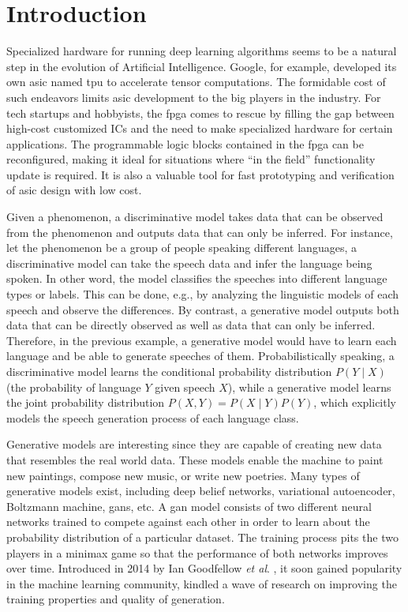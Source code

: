 
\chapter{Introduction}

Specialized hardware for running deep learning algorithms seems to be a natural step in the evolution of
Artificial Intelligence.  Google, for example, developed its own \gls{asic} named \gls{tpu}
to accelerate tensor computations. The formidable cost of such endeavors limits \gls{asic} development to
the big players in the industry. For tech startups and hobbyists, the \gls{fpga} comes to rescue by filling
the gap between high-cost customized ICs and the need to make specialized hardware for certain
applications. The programmable logic blocks contained in the \gls{fpga} can be reconfigured, making it
ideal for situations where "`in the field"' functionality update is required. It is also a valuable tool
for fast prototyping and verification of \gls{asic} design with low cost.

Given a phenomenon, a discriminative model takes data that can be observed from the phenomenon and outputs
data that can only be inferred. For instance, let the phenomenon be a group of people speaking different
languages, a discriminative model can take the speech data and infer the language being spoken. In other
word, the model classifies the speeches into different language types or labels. This can be done, e.g.,
by analyzing the linguistic models of each speech and observe the differences. By contrast, a generative
model outputs both data that can be directly observed as well as data that can only be inferred. Therefore,
in the previous example, a generative model would have to learn each language and be able to generate
speeches of them. Probabilistically speaking, a discriminative model learns the conditional probability
distribution $P(Y \mid X)$ (the probability of language $Y$ given speech $X$), while a generative model
learns the joint probability distribution $P(X,Y) = P(X \mid Y)P(Y)$, which explicitly models the speech
generation process of each language class.

Generative models are interesting since they are capable of creating new data that resembles the real world
data. These models enable the machine to paint new paintings, compose new music, or write new poetries.
Many types of generative models exist, including deep belief networks, variational autoencoder,
Boltzmann machine, \gls{gan}s, etc. A \gls{gan} model consists of two different neural networks trained to
compete against each other in order to learn about the probability distribution of a particular dataset.
The training process pits the two players in a minimax game so that the performance of both networks improves
over time. Introduced in 2014 by Ian Goodfellow \textit{et al}. \cite{goodfellow:gan}, it soon gained
popularity in the machine learning community, kindled a wave of research on improving the training properties
and quality of generation.

